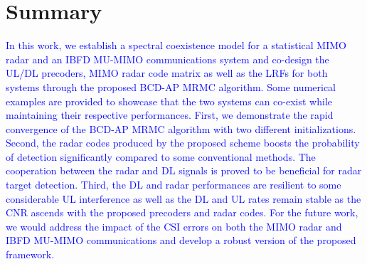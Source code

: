 \documentclass[9pt,journal]{IEEEtran}
\theoremstyle{definition}
\begin{document}
\section{Summary}
\label{sec:conclusion}
\textcolor{blue}{In this work, we establish a spectral coexistence model for a statistical MIMO radar and an IBFD MU-MIMO communications system and co-design the UL/DL precoders, MIMO radar code matrix as well as the LRFs for both systems through the proposed BCD-AP MRMC algorithm. Some numerical examples are provided to showcase that the two systems can co-exist while maintaining their respective performances. First, we demonstrate the rapid convergence of the BCD-AP MRMC algorithm with two different initializations. Second, the radar codes produced by the proposed scheme boosts the probability of detection significantly compared to some conventional methods. The cooperation between the radar and DL signals is proved to be beneficial for radar target detection. Third, the DL and radar performances are resilient to some considerable UL interference as well as the DL and UL rates remain stable as the CNR ascends with the proposed precoders and radar codes. %
For the future work, we would address the impact of the CSI errors on both the MIMO radar and IBFD MU-MIMO communications and develop a robust version of the proposed framework.}
	
\end{document}
